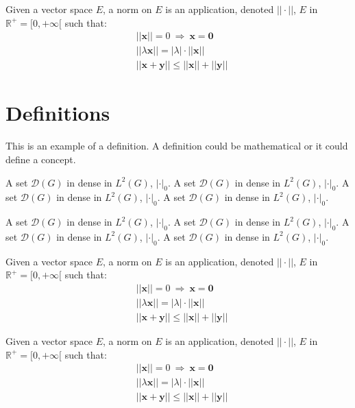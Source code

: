 \begin{exercise}
\label{ex:A0}
Given a vector space $E$, a norm on $E$ is an application, denoted $||\cdot||$, $E$ in $\mathbb{R}^+=[0,+\infty[$ such that:
\begin{align}
& ||\mathbf{x}||=0\ \Rightarrow\ \mathbf{x}=\mathbf{0}\\
& ||\lambda \mathbf{x}||=|\lambda|\cdot ||\mathbf{x}||\\
& ||\mathbf{x}+\mathbf{y}||\leq ||\mathbf{x}||+||\mathbf{y}||
\end{align}
\end{exercise}


\section{Definitions}

This is an example of a definition. A definition could be mathematical or it could define a concept.
\begin{theorem}
\label{theo:C}
A set $\mathcal{D}(G)$ in dense in $L^2(G)$, $|\cdot|_0$. A set $\mathcal{D}(G)$ in dense in $L^2(G)$, $|\cdot|_0$. 
A set $\mathcal{D}(G)$ in dense in $L^2(G)$, $|\cdot|_0$. A set $\mathcal{D}(G)$ in dense in $L^2(G)$, $|\cdot|_0$. 
\end{theorem}

\begin{theorem}
\label{theo:D}
A set $\mathcal{D}(G)$ in dense in $L^2(G)$, $|\cdot|_0$. A set $\mathcal{D}(G)$ in dense in $L^2(G)$, $|\cdot|_0$. 
A set $\mathcal{D}(G)$ in dense in $L^2(G)$, $|\cdot|_0$. A set $\mathcal{D}(G)$ in dense in $L^2(G)$, $|\cdot|_0$. 
\end{theorem}

\begin{definition}
Given a vector space $E$, a norm on $E$ is an application, denoted $||\cdot||$, $E$ in $\mathbb{R}^+=[0,+\infty[$ such that:
\begin{align}
& ||\mathbf{x}||=0\ \Rightarrow\ \mathbf{x}=\mathbf{0}\\
& ||\lambda \mathbf{x}||=|\lambda|\cdot ||\mathbf{x}||\\
& ||\mathbf{x}+\mathbf{y}||\leq ||\mathbf{x}||+||\mathbf{y}||
\end{align}
\end{definition}

\begin{theorem}
\label{theo:E}
Given a vector space $E$, a norm on $E$ is an application, denoted $||\cdot||$, $E$ in $\mathbb{R}^+=[0,+\infty[$ such that:
\begin{align}
& ||\mathbf{x}||=0\ \Rightarrow\ \mathbf{x}=\mathbf{0}\\
& ||\lambda \mathbf{x}||=|\lambda|\cdot ||\mathbf{x}||\\
& ||\mathbf{x}+\mathbf{y}||\leq ||\mathbf{x}||+||\mathbf{y}||
\end{align}
\end{theorem}

